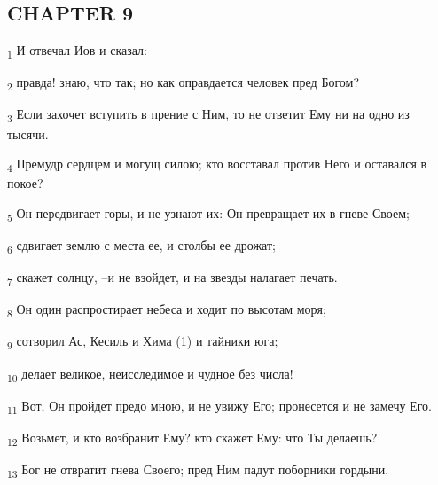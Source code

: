 \subsection{CHAPTER 9}
\begin{tcolorbox}
\textsubscript{1} И отвечал Иов и сказал:
\end{tcolorbox}
\begin{tcolorbox}
\textsubscript{2} правда! знаю, что так; но как оправдается человек пред Богом?
\end{tcolorbox}
\begin{tcolorbox}
\textsubscript{3} Если захочет вступить в прение с Ним, то не ответит Ему ни на одно из тысячи.
\end{tcolorbox}
\begin{tcolorbox}
\textsubscript{4} Премудр сердцем и могущ силою; кто восставал против Него и оставался в покое?
\end{tcolorbox}
\begin{tcolorbox}
\textsubscript{5} Он передвигает горы, и не узнают их: Он превращает их в гневе Своем;
\end{tcolorbox}
\begin{tcolorbox}
\textsubscript{6} сдвигает землю с места ее, и столбы ее дрожат;
\end{tcolorbox}
\begin{tcolorbox}
\textsubscript{7} скажет солнцу, --и не взойдет, и на звезды налагает печать.
\end{tcolorbox}
\begin{tcolorbox}
\textsubscript{8} Он один распростирает небеса и ходит по высотам моря;
\end{tcolorbox}
\begin{tcolorbox}
\textsubscript{9} сотворил Ас, Кесиль и Хима (1) и тайники юга;
\end{tcolorbox}
\begin{tcolorbox}
\textsubscript{10} делает великое, неисследимое и чудное без числа!
\end{tcolorbox}
\begin{tcolorbox}
\textsubscript{11} Вот, Он пройдет предо мною, и не увижу Его; пронесется и не замечу Его.
\end{tcolorbox}
\begin{tcolorbox}
\textsubscript{12} Возьмет, и кто возбранит Ему? кто скажет Ему: что Ты делаешь?
\end{tcolorbox}
\begin{tcolorbox}
\textsubscript{13} Бог не отвратит гнева Своего; пред Ним падут поборники гордыни.
\end{tcolorbox}
